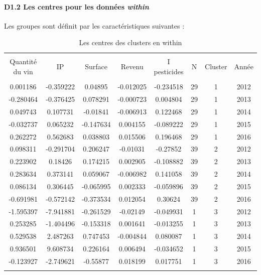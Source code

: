 \documentclass[11pt,]{article}
\let\oldparagraph\paragraph
\renewcommand{\paragraph}[1]{\oldparagraph{#1}\mbox{}}
\begin{document}
\FloatBarrier

\hypertarget{d1.2-les-centres-pour-les-donnees-within}{%
\paragraph{\texorpdfstring{D1.2 Les centres pour les données
\emph{within}}{D1.2 Les centres pour les données within}}\label{d1.2-les-centres-pour-les-donnees-within}}

Les groupes sont définit par les caractéristiques suivantes :

\FloatBarrier

\begin{table}[!htbp] \centering 
  \caption{Les centres des clusters en within} 
  \label{} 
\begin{tabular}{@{\extracolsep{5pt}} cccccccc} 
\\[-1.8ex]\hline 
\hline \\[-1.8ex] 
Quantité du vin & IP & Surface & Revenu & I pesticides & N & Cluster & Année \\ 
\hline \\[-1.8ex] 
0.001186 & -0.359222 & 0.04895 & -0.012025 & -0.234518 & 29 & 1 & 2012 \\ 
-0.280464 & -0.376425 & 0.078291 & -0.000723 & 0.004804 & 29 & 1 & 2013 \\ 
0.049743 & 0.107731 & -0.01841 & -0.006913 & 0.122468 & 29 & 1 & 2014 \\ 
-0.032737 & 0.065232 & -0.147634 & 0.004155 & -0.089222 & 29 & 1 & 2015 \\ 
0.262272 & 0.562683 & 0.038803 & 0.015506 & 0.196468 & 29 & 1 & 2016 \\ 
0.098311 & -0.291704 & 0.206247 & -0.01031 & -0.27852 & 39 & 2 & 2012 \\ 
0.223902 & 0.18426 & 0.174215 & 0.002905 & -0.108882 & 39 & 2 & 2013 \\ 
0.283634 & 0.373141 & 0.059067 & -0.006982 & 0.141058 & 39 & 2 & 2014 \\ 
0.086134 & 0.306445 & -0.065995 & 0.002333 & -0.059896 & 39 & 2 & 2015 \\ 
-0.691981 & -0.572142 & -0.373534 & 0.012054 & 0.30624 & 39 & 2 & 2016 \\ 
-1.595397 & -7.941881 & -0.261529 & -0.02149 & -0.049931 & 1 & 3 & 2012 \\ 
0.253285 & -1.404496 & -0.153318 & 0.001641 & -0.013255 & 1 & 3 & 2013 \\ 
0.529538 & 2.487263 & 0.747453 & -0.004844 & 0.080087 & 1 & 3 & 2014 \\ 
0.936501 & 9.608734 & 0.226164 & 0.006494 & -0.034652 & 1 & 3 & 2015 \\ 
-0.123927 & -2.749621 & -0.55877 & 0.018199 & 0.017751 & 1 & 3 & 2016 \\ 
\hline \\[-1.8ex] 
\end{tabular} 
\end{table}
\end{document}

